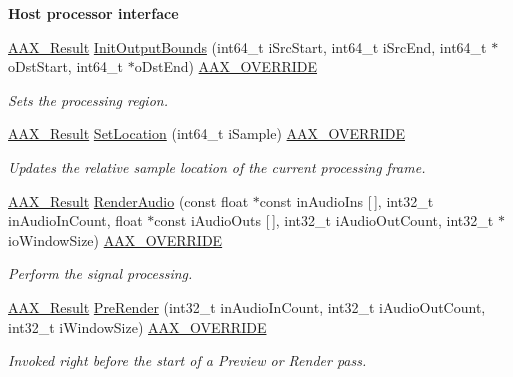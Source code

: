 \begin{Indent}\textbf{ Host processor interface}\par
\begin{DoxyCompactItemize}
\item 
\mbox{\hyperlink{a00392_a4d8f69a697df7f70c3a8e9b8ee130d2f}{A\+A\+X\+\_\+\+Result}} \mbox{\hyperlink{a01485_a8beff35a046a1b3c780b1ecc1ded7e6e}{Init\+Output\+Bounds}} (int64\+\_\+t i\+Src\+Start, int64\+\_\+t i\+Src\+End, int64\+\_\+t $\ast$o\+Dst\+Start, int64\+\_\+t $\ast$o\+Dst\+End) \mbox{\hyperlink{a00392_ac2f24a5172689ae684344abdcce55463}{A\+A\+X\+\_\+\+O\+V\+E\+R\+R\+I\+DE}}
\begin{DoxyCompactList}\small\item\em Sets the processing region. \end{DoxyCompactList}\item 
\mbox{\hyperlink{a00392_a4d8f69a697df7f70c3a8e9b8ee130d2f}{A\+A\+X\+\_\+\+Result}} \mbox{\hyperlink{a01485_a35430586fa6800db61b6db563b73a6b1}{Set\+Location}} (int64\+\_\+t i\+Sample) \mbox{\hyperlink{a00392_ac2f24a5172689ae684344abdcce55463}{A\+A\+X\+\_\+\+O\+V\+E\+R\+R\+I\+DE}}
\begin{DoxyCompactList}\small\item\em Updates the relative sample location of the current processing frame. \end{DoxyCompactList}\item 
\mbox{\hyperlink{a00392_a4d8f69a697df7f70c3a8e9b8ee130d2f}{A\+A\+X\+\_\+\+Result}} \mbox{\hyperlink{a01485_a66e6a701d8dd7d69accde128cb98b342}{Render\+Audio}} (const float $\ast$const in\+Audio\+Ins \mbox{[}$\,$\mbox{]}, int32\+\_\+t in\+Audio\+In\+Count, float $\ast$const i\+Audio\+Outs \mbox{[}$\,$\mbox{]}, int32\+\_\+t i\+Audio\+Out\+Count, int32\+\_\+t $\ast$io\+Window\+Size) \mbox{\hyperlink{a00392_ac2f24a5172689ae684344abdcce55463}{A\+A\+X\+\_\+\+O\+V\+E\+R\+R\+I\+DE}}
\begin{DoxyCompactList}\small\item\em Perform the signal processing. \end{DoxyCompactList}\item 
\mbox{\hyperlink{a00392_a4d8f69a697df7f70c3a8e9b8ee130d2f}{A\+A\+X\+\_\+\+Result}} \mbox{\hyperlink{a01485_a20a99c657e4d12f446e965c567fdd711}{Pre\+Render}} (int32\+\_\+t in\+Audio\+In\+Count, int32\+\_\+t i\+Audio\+Out\+Count, int32\+\_\+t i\+Window\+Size) \mbox{\hyperlink{a00392_ac2f24a5172689ae684344abdcce55463}{A\+A\+X\+\_\+\+O\+V\+E\+R\+R\+I\+DE}}
\begin{DoxyCompactList}\small\item\em Invoked right before the start of a Preview or Render pass. \end{DoxyCompactList}\item 

\end{DoxyCompactItemize}
\end{Indent}
